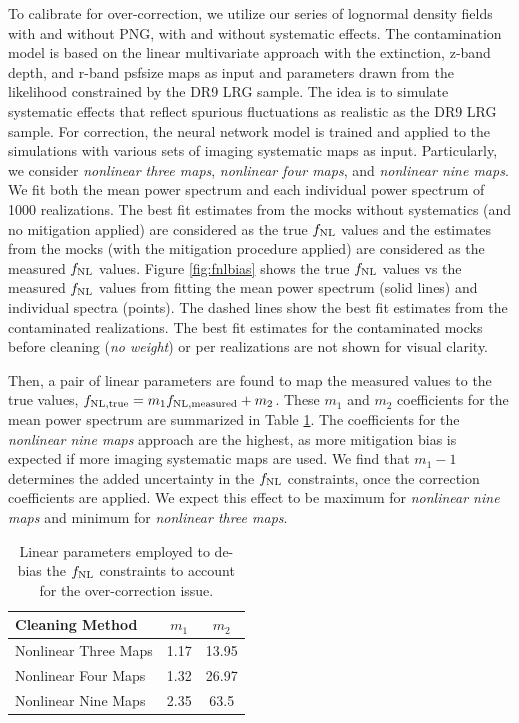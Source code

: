 To calibrate for over-correction, we utilize our series of lognormal density fields with and without PNG, with and without systematic effects. The contamination model is based on the linear multivariate approach with the extinction, z-band depth, and r-band psfsize maps as input and parameters drawn from the likelihood constrained by the DR9 LRG sample. The idea is to simulate systematic effects that reflect spurious fluctuations as  realistic as the DR9 LRG sample. For correction, the neural network model is trained and applied to the simulations with various sets of imaging systematic maps as input. Particularly, we consider \textit{nonlinear three maps}, \textit{nonlinear four maps}, and \textit{nonlinear nine maps}. We fit both the mean power spectrum and each individual power spectrum of 1000 realizations. The best fit estimates from the mocks without systematics (and no mitigation applied) are considered as the true $f_{\rm NL}$ values and the estimates from the mocks (with the mitigation procedure applied) are considered as the measured $f_{\rm NL}$ values. Figure \ref{fig:fnlbias} shows the true $f_{\rm NL}$ values vs the measured $f_{\rm NL}$ values from fitting the mean power spectrum (solid lines) and individual spectra (points). The dashed lines show the best fit estimates from the contaminated realizations. The best fit estimates for the contaminated mocks before cleaning (\textit{no weight}) or per realizations are not shown for visual clarity. 

Then, a pair of linear parameters are found to map the measured values to the true values, $f_{\rm NL, true} = m_{1} f_{\rm NL, measured} + m_{2}$. These $m_{1}$ and $m_{2}$ coefficients for the mean power spectrum are summarized in Table \ref{tab:debiasparams}. The coefficients for the \textit{nonlinear nine maps} approach are the highest, as more mitigation bias is expected if more imaging systematic maps are used. We find that $m_{1}-1$ determines the added uncertainty in the $f_{\rm NL}$ constraints, once the correction coefficients are applied. We expect this effect to be maximum for \textit{nonlinear nine maps} and minimum for \textit{nonlinear three maps}.

\begin{table}
\begin{center}
\caption{Linear parameters employed to de-bias the $f_{\rm NL}$ constraints to account for the over-correction issue.}\label{tab:debiasparams}
\begin{tabular}{lcc}
\hline
\hline
\textbf{Cleaning Method} & $m_{1}$ & $m_{2}$ \\
\hline
Nonlinear Three Maps & 1.17 & 13.95 \\
Nonlinear Four Maps & 1.32 & 26.97 \\
Nonlinear Nine Maps & 2.35 & 63.5\\
\hline
\end{tabular}
\end{center}
\end{table}
